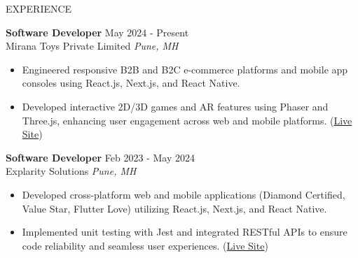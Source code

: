 \documentclass{resume} %
\begin{document}
\begin{rSection}{EXPERIENCE}
\renewcommand{\baselinestretch}{1.2}\normalsize

\textbf{Software Developer} \hfill May 2024 - Present\\
Mirana Toys Private Limited \hfill \textit{Pune, MH}
 \begin{itemize}
    \itemsep - {}
     \item Engineered responsive B2B and B2C e-commerce platforms and mobile app consoles using React.js, Next.js, and React Native.
     \item Developed interactive 2D/3D games and AR features using Phaser and Three.js, enhancing user engagement across web and mobile platforms. (\href{https://miranatoys.com/}{Live Site})
 \end{itemize}

\textbf{Software Developer} \hfill Feb 2023 - May 2024\\
Explarity Solutions \hfill \textit{Pune, MH}
 \begin{itemize}
    \itemsep - {}
     \item Developed cross-platform web and mobile applications (Diamond Certified, Value Star, Flutter Love) utilizing React.js, Next.js, and React Native.
     \item Implemented unit testing with Jest and integrated RESTful APIs to ensure code reliability and seamless user experiences. (\href{https://diamondcertified.org/}{Live Site})
 \end{itemize}

\end{rSection}

\end{document}
